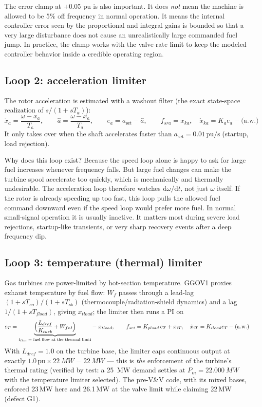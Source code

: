 \documentclass[11pt]{article}
\newcommand{\pu}{\,\text{pu}}
\newcommand{\dd}{\mathrm{d}}
\begin{document}
The error clamp at $\pm0.05$ pu is also important. It does \emph{not}
mean the machine is allowed to be 5\% off frequency in normal operation.
It means the internal controller error seen by the proportional and
integral gains is bounded so that a very large disturbance does not cause
an unrealistically large commanded fuel jump. In practice, the clamp works
with the valve-rate limit to keep the modeled controller behavior inside a
credible operating region.

\subsection{Loop 2: acceleration limiter}
The rotor acceleration is estimated with a washout filter (the exact
state-space realization of $s/(1+sT_a)$):
\begin{equation}
  \dot x_a = \frac{\omega - x_a}{T_a}, \qquad
  \hat a = \frac{\omega - x_a}{T_a}, \qquad
  e_a = a_\text{set} - \hat a, \qquad
  f_{sra} = x_{ka}, \quad \dot x_{ka} = K_a e_a - \text{(a.w.)}
\end{equation}
It only takes over when the shaft accelerates faster than $a_\text{set} =
0.01\pu/\text{s}$ (startup, load rejection).

Why does this loop exist? Because the speed loop alone is happy to ask for
large fuel increases whenever frequency falls. But large fuel changes can
make the turbine spool accelerate too quickly, which is mechanically and
thermally undesirable. The acceleration loop therefore watches
$\dd\omega/\dd t$, not just $\omega$ itself. If the rotor is already
speeding up too fast, this loop pulls the allowed fuel command downward
even if the speed loop would prefer more fuel. In normal small-signal
operation it is usually inactive. It matters most during severe load
rejections, startup-like transients, or very sharp recovery events after a
deep frequency dip.

\subsection{Loop 3: temperature (thermal) limiter}
Gas turbines are power-limited by hot-section temperature. GGOV1 proxies
exhaust temperature by fuel flow: $W_f$ passes through a lead-lag
$(1+sT_{sa})/(1+sT_{sb})$ (thermocouple/radiation-shield dynamics) and a
lag $1/(1+sT_{fload})$, giving $x_{tload}$; the limiter then runs a PI on
\begin{equation}
  e_T = \underbrace{\Bigl(\frac{L_{dref}}{K_{turb}} + W_{fnl}\Bigr)}_{t_{lim}
   \;=\; \text{fuel flow at the thermal limit}} - \; x_{tload},
  \qquad
  f_{srt} = K_{pload}\,e_T + x_{iT}, \quad \dot x_{iT} = K_{iload}e_T - \text{(a.w.)}
\end{equation}
With $L_{dref} = 1.0$ on the turbine base, the limiter caps continuous
output at exactly $1.0\pu \times \SI{22}{MW} = \SI{22}{MW}$ --- this is
\emph{the} enforcement of the turbine's thermal rating (verified by test:
a \SI{25}{MW} demand settles at $P_m = \SI{22.000}{MW}$ with the
temperature limiter selected). The pre-V\&V code, with its mixed bases,
enforced 23\,MW here and 26.1\,MW at the valve limit while claiming 22\,MW
(defect G1).
\end{document}
